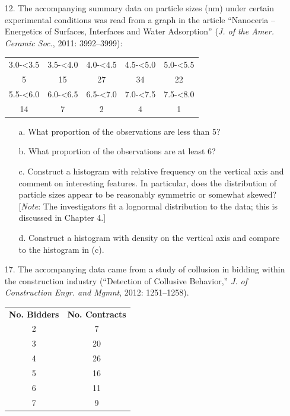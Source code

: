 \documentclass[letterpaper,12pt]{article}
\begin{document}
\begin{enumerate}
  \item[12.]
    The accompanying summary data on  particle sizes (nm) under certain experimental conditions was read from a graph in the article ``Nanoceria – Energetics of Surfaces, Interfaces and Water Adsorption'' (\textit{J. of the Amer. Ceramic Soc.}, 2011: 3992–3999):
    \begin{center}
    \begin{tabular}{c c c c c}
      3.0-<3.5 & 3.5-<4.0 & 4.0-<4.5 & 4.5-<5.0 & 5.0-<5.5 \\
      5 & 15 & 27 & 34 & 22 \\
      5.5-<6.0 & 6.0-<6.5 & 6.5-<7.0 &  7.0-<7.5 & 7.5-<8.0 \\
      14 & 7 & 2 & 4 & 1
    \end{tabular}
    \end{center}
    \begin{enumerate}
      \item[a.]
        What proportion of the observations are less than 5?
      \item[b.]
        What proportion of the observations are at least 6?
      \item[c.]
        Construct a histogram with relative frequency on the vertical axis and comment on interesting features. In particular, does the distribution of particle sizes appear to be reasonably symmetric or somewhat skewed? [\textit{Note}: The investigators fit a lognormal distribution to the data; this is discussed in Chapter 4.]
      \item[d.]
        Construct a histogram with density on the vertical axis and compare to the histogram in (c).
    \end{enumerate}
  \item[17.]
    The accompanying data came from a study of collusion in bidding within the construction industry (``Detection of Collusive Behavior,'' \textit{J. of Construction Engr. and Mgmnt}, 2012: 1251–1258).
    \begin{center}
    \begin{tabular}{S[table-format=2.0]S[table-format=2.0]}
      \textbf{No. Bidders} & \textbf{No. Contracts} \\
      2 & 7 \\
      3 & 20 \\
      4 & 26 \\
      5 & 16 \\
      6 & 11 \\
      7 & 9 \\

\end{tabular}
\end{center}
\end{enumerate}
\end{document}
